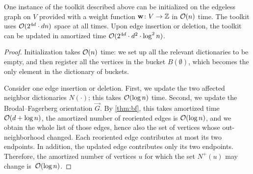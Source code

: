 \begin{lemma}[Toolkit]\label{lem:infra-update}
One instance of the toolkit described above can be initialized on the edgeless graph on $V$ provided with a weight function $\mathbf{w}\colon V\to \mathbb{Z}$ in $\mathcal{O}(n)$ time.
The toolkit uses $\mathcal{O}(2^{4d}\cdot dn)$ space at all times.
Upon edge insertion or deletion, the toolkit can be updated in amortized time $\mathcal{O}(2^{4d}\cdot d^2\cdot\log^2 n)$. %
\end{lemma}
\begin{proof}
Initialization takes $\mathcal{O}(n)$ time: we set up all the relevant dictionaries to be empty, and then register all the vertices in the bucket $B(\emptyset)$, which becomes the only element in the dictionary of buckets.


Consider one edge insertion or deletion.
First, we update the two affected neighbor dictionaries $N(\cdot)$; this takes $\mathcal{O}(\log n)$ time.
Second, we update the Brodal--Fagerberg orientation $\vec G$.
By \cref{thm:bf}, this takes amortized time $\mathcal{O}(d+\log n)$, the amortized number of reoriented edges is $\mathcal{O}(\log n)$, and we obtain the whole list of those edges, hence also the set of vertices whose out-neighborhood changed.
Each reoriented edge contributes at most its two endpoints.
In addition, the updated edge contributes only its two endpoints. %
Therefore, the amortized number of vertices $u$ for which the set $N^+(u)$ may change is~$\mathcal{O}(\log n)$.


\end{proof}
